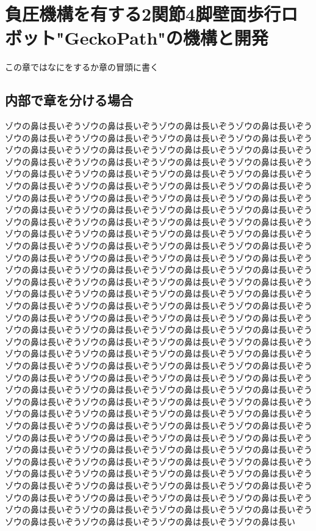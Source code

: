 \chapter{負圧機構を有する2関節4脚壁面歩行ロボット"GeckoPath"の機構と開発}
\label{Sec:experiment}

この章ではなにをするか章の冒頭に書く


\section{内部で章を分ける場合}\label{Sec:sub_experiment}

ゾウの鼻は長いぞうゾウの鼻は長いぞうゾウの鼻は長いぞうゾウの鼻は長いぞうゾウの鼻は長いぞうゾウの鼻は長いぞうゾウの鼻は長いぞうゾウの鼻は長いぞうゾウの鼻は長いぞうゾウの鼻は長いぞうゾウの鼻は長いぞうゾウの鼻は長いぞうゾウの鼻は長いぞうゾウの鼻は長いぞうゾウの鼻は長いぞうゾウの鼻は長いぞうゾウの鼻は長いぞうゾウの鼻は長いぞうゾウの鼻は長いぞうゾウの鼻は長いぞうゾウの鼻は長いぞうゾウの鼻は長いぞうゾウの鼻は長いぞうゾウの鼻は長いぞうゾウの鼻は長いぞうゾウの鼻は長いぞうゾウの鼻は長いぞうゾウの鼻は長いぞうゾウの鼻は長いぞうゾウの鼻は長いぞうゾウの鼻は長いぞうゾウの鼻は長いぞうゾウの鼻は長いぞうゾウの鼻は長いぞうゾウの鼻は長いぞうゾウの鼻は長いぞうゾウの鼻は長いぞうゾウの鼻は長いぞうゾウの鼻は長いぞうゾウの鼻は長いぞうゾウの鼻は長いぞうゾウの鼻は長いぞうゾウの鼻は長いぞうゾウの鼻は長いぞうゾウの鼻は長いぞうゾウの鼻は長いぞうゾウの鼻は長いぞうゾウの鼻は長いぞうゾウの鼻は長いぞうゾウの鼻は長いぞうゾウの鼻は長いぞうゾウの鼻は長いぞうゾウの鼻は長いぞうゾウの鼻は長いぞうゾウの鼻は長いぞうゾウの鼻は長いぞうゾウの鼻は長いぞうゾウの鼻は長いぞうゾウの鼻は長いぞうゾウの鼻は長いぞうゾウの鼻は長いぞうゾウの鼻は長いぞうゾウの鼻は長いぞうゾウの鼻は長いぞうゾウの鼻は長いぞうゾウの鼻は長いぞうゾウの鼻は長いぞうゾウの鼻は長いぞうゾウの鼻は長いぞうゾウの鼻は長いぞうゾウの鼻は長いぞうゾウの鼻は長いぞうゾウの鼻は長いぞうゾウの鼻は長いぞうゾウの鼻は長いぞうゾウの鼻は長いぞうゾウの鼻は長いぞうゾウの鼻は長いぞうゾウの鼻は長いぞうゾウの鼻は長いぞうゾウの鼻は長いぞうゾウの鼻は長いぞうゾウの鼻は長いぞうゾウの鼻は長いぞうゾウの鼻は長いぞうゾウの鼻は長いぞうゾウの鼻は長いぞうゾウの鼻は長いぞうゾウの鼻は長いぞうゾウの鼻は長いぞうゾウの鼻は長いぞうゾウの鼻は長いぞうゾウの鼻は長いぞうゾウの鼻は長いぞうゾウの鼻は長いぞうゾウの鼻は長いぞうゾウの鼻は長いぞうゾウの鼻は長いぞうゾウの鼻は長いぞうゾウの鼻は長いぞうゾウの鼻は長いぞうゾウの鼻は長いぞうゾウの鼻は長いぞうゾウの鼻は長いぞうゾウの鼻は長いぞうゾウの鼻は長いぞうゾウの鼻は長いぞうゾウの鼻は長いぞうゾウの鼻は長いぞうゾウの鼻は長いぞうゾウの鼻は長いぞうゾウの鼻は長いぞうゾウの鼻は長いぞうゾウの鼻は長いぞうゾウの鼻は長いぞうゾウの鼻は長いぞうゾウの鼻は長いぞうゾウの鼻は長いぞうゾウの鼻は長いぞうゾウの鼻は長いぞうゾウの鼻は長いぞうゾウの鼻は長いぞうゾウの鼻は長いぞうゾウの鼻は長いぞうゾウの鼻は長いぞうゾウの鼻は長いぞうゾウの鼻は長いぞうゾウの鼻は長いぞうゾウの鼻は長いぞうゾウの鼻は長いぞうゾウの鼻は長いぞうゾウの鼻は長いぞうゾウの鼻は長いぞうゾウの鼻は長いぞうゾウの鼻は長いぞうゾウの鼻は長い